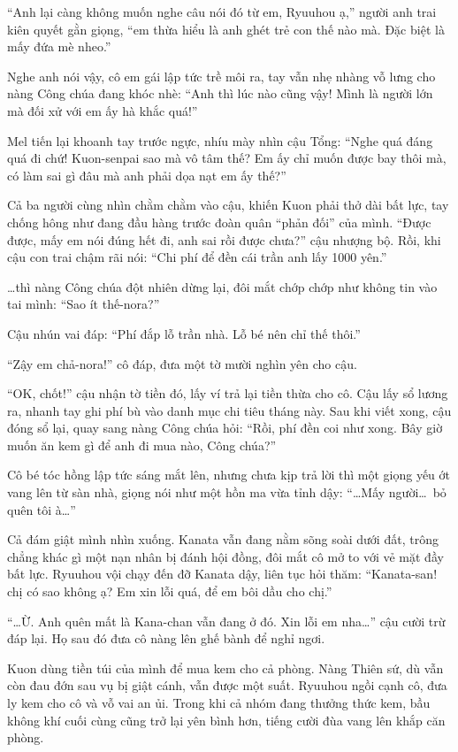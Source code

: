 \documentclass[../main.tex]{subfiles}
\begin{document}
``Anh lại càng không muốn nghe câu nói đó từ em, Ryuuhou ạ,'' người anh trai kiên quyết gằn giọng, ``em thừa hiểu là anh ghét trẻ con thế nào mà. Đặc biệt là mấy đứa mè nheo.''

Nghe anh nói vậy, cô em gái lập tức trề môi ra, tay vẫn nhẹ nhàng vỗ lưng cho nàng Công chúa đang khóc nhè: ``Anh thì lúc nào cũng vậy! Mình là người lớn mà đối xử với em ấy hà khắc quá!''

Mel tiến lại khoanh tay trước ngực, nhíu mày nhìn cậu Tổng: ``Nghe quá đáng quá đi chứ! Kuon-senpai sao mà vô tâm thế? Em ấy chỉ muốn được bay thôi mà, có làm sai gì đâu mà anh phải dọa nạt em ấy thế?''

Cả ba người cùng nhìn chằm chằm vào cậu, khiến Kuon phải thở dài bất lực, tay chống hông như đang đầu hàng trước đoàn quân ``phản đối'' của mình. ``Được được, mấy em nói đúng hết đi, anh sai rồi được chưa?'' cậu nhượng bộ. Rồi, khi cậu con trai chậm rãi nói: ``Chi phí để đền cái trần anh lấy 1000 yên.''

\dots thì nàng Công chúa đột nhiên dừng lại, đôi mắt chớp chớp như không tin vào tai mình: ``Sao ít thế-nora?''

Cậu nhún vai đáp: ``Phí đắp lỗ trần nhà. Lỗ bé nên chỉ thế thôi.''

``Zậy em chả-nora!'' cô đáp, đưa một tờ mười nghìn yên cho cậu.

``OK, chốt!'' cậu nhận tờ tiền đó, lấy ví trả lại tiền thừa cho cô. Cậu lấy sổ lương ra, nhanh tay ghi phí bù vào danh mục chi tiêu tháng này. Sau khi viết xong, cậu đóng sổ lại, quay sang nàng Công chúa hỏi: ``Rồi, phí đền coi như xong. Bây giờ muốn ăn kem gì để anh đi mua nào, Công chúa?''

Cô bé tóc hồng lập tức sáng mắt lên, nhưng chưa kịp trả lời thì một giọng yếu ớt vang lên từ sàn nhà, giọng nói như một hồn ma vừa tỉnh dậy: ``\dots Mấy người\dots\ bỏ quên tôi à\dots''

Cả đám giật mình nhìn xuống. Kanata vẫn đang nằm sõng soài dưới đất, trông chẳng khác gì một nạn nhân bị đánh hội đồng, đôi mắt cô mở to với vẻ mặt đầy bất lực. Ryuuhou vội chạy đến đỡ Kanata dậy, liên tục hỏi thăm: ``Kanata-san! chị có sao không ạ? Em xin lỗi quá, để em bôi dầu cho chị.''

``\dots Ừ. Anh quên mất là Kana-chan vẫn đang ở đó. Xin lỗi em nha\dots'' cậu cười trừ đáp lại. Họ sau đó đưa cô nàng lên ghế bành để nghỉ ngơi.

Kuon dùng tiền túi của mình để mua kem cho cả phòng. Nàng Thiên sứ, dù vẫn còn đau đớn sau vụ bị giật cánh, vẫn được một suất. Ryuuhou ngồi cạnh cô, đưa ly kem cho cô và vỗ vai an ủi. Trong khi cả nhóm đang thưởng thức kem, bầu không khí cuối cùng cũng trở lại yên bình hơn, tiếng cười đùa vang lên khắp căn phòng.
\end{document}
